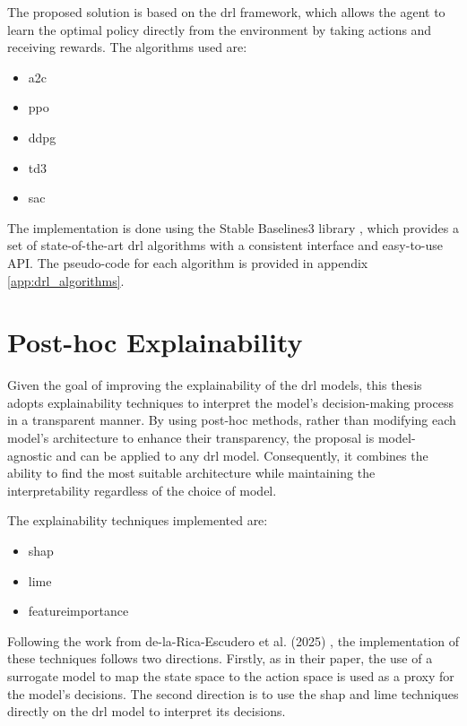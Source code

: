 The proposed solution is based on the \acrshort{drl} framework, which allows the agent to learn the optimal policy directly from the environment by taking actions and receiving rewards. The algorithms used are:
\begin{itemize}
    \item \acrfull{a2c}
    \item \acrfull{ppo}
    \item \acrfull{ddpg}
    \item \acrfull{td3}
    \item \acrfull{sac}
\end{itemize}

The implementation is done using the Stable Baselines3 library \cite{Raffin2021}, which provides a set of state-of-the-art \acrshort{drl} algorithms with a consistent interface and easy-to-use API. The pseudo-code for each algorithm is provided in appendix \ref{app:drl_algorithms}.

\section{Post-hoc Explainability} \label{sec:post_hoc_explainability}

Given the goal of improving the explainability of the \acrshort{drl} models, this thesis adopts explainability techniques to interpret the model's decision-making process in a transparent manner. By using post-hoc methods, rather than modifying each model's architecture to enhance their transparency, the proposal is model-agnostic and can be applied to any \acrshort{drl} model. Consequently, it combines the ability to find the most suitable architecture while maintaining the interpretability regardless of the choice of model. 

The explainability techniques implemented are: 
\begin{itemize}
    \item \acrfull{shap}
    \item \acrfull{lime}
    \item \Gls{featureimportance}
\end{itemize}

Following the work from de-la-Rica-Escudero et al. (2025) \cite{de-La-Rica-Escudero2025}, the implementation of these techniques follows two directions. Firstly, as in their paper, the use of a surrogate model to map the state space to the action space is used as a proxy for the model's decisions. The second direction is to use the \acrshort{shap} and \acrshort{lime} techniques directly on the \acrshort{drl} model to interpret its decisions.
